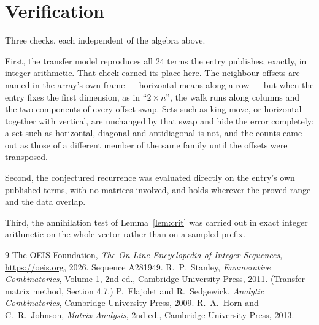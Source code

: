 \documentclass[11pt,a4paper]{article}
\theoremstyle{plain}
\theoremstyle{definition}
\begin{document}
\section{Verification}

Three checks, each independent of the algebra above.

First, the transfer model reproduces all $24$ terms the entry publishes, exactly, in
integer arithmetic. That check earned its place here. The neighbour offsets are named in the
array's own frame --- horizontal means along a row --- but when the entry fixes the first
dimension, as in ``$2\times n$'', the walk runs along columns and the two components of every
offset swap. Sets such as king-move, or horizontal together with vertical, are unchanged by
that swap and hide the error completely; a set such as horizontal, diagonal and antidiagonal
is not, and the counts came out as those of a different member of the same family until the
offsets were transposed.

Second, the conjectured recurrence was evaluated directly on the entry's own published terms,
with no matrices involved, and holds wherever the proved range and the data overlap.

Third, the annihilation test of Lemma~\ref{lem:crit} was carried out in exact integer
arithmetic on the whole vector rather than on a sampled prefix.

\begin{thebibliography}{9}
 The OEIS Foundation, \emph{The On-Line Encyclopedia of Integer
Sequences}, \url{https://oeis.org}, 2026. Sequence A281949.
 R.~P.~Stanley, \emph{Enumerative Combinatorics}, Volume 1, 2nd ed.,
Cambridge University Press, 2011. (Transfer-matrix method, Section 4.7.)
 P.~Flajolet and R.~Sedgewick, \emph{Analytic Combinatorics}, Cambridge
University Press, 2009.
 R.~A.~Horn and C.~R.~Johnson, \emph{Matrix Analysis}, 2nd ed., Cambridge
University Press, 2013.
\end{thebibliography}
\end{document}
